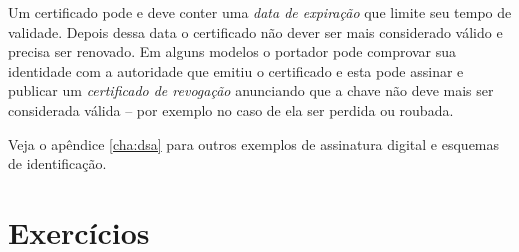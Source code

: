Um certificado pode e deve conter uma {\em data de expiração} que limite seu tempo de validade.
Depois dessa data o certificado não dever ser mais considerado válido e precisa ser renovado.
Em alguns modelos o portador pode comprovar sua identidade com a autoridade que emitiu o certificado e esta pode assinar e publicar um {\em certificado de revogação} anunciando que a chave não deve mais ser considerada válida -- por exemplo no caso de ela ser perdida ou roubada.

Veja o apêndice \ref{cha:dsa} para outros exemplos de assinatura digital e esquemas de identificação.

\section{Exercícios}
\label{sec:exercicios}




